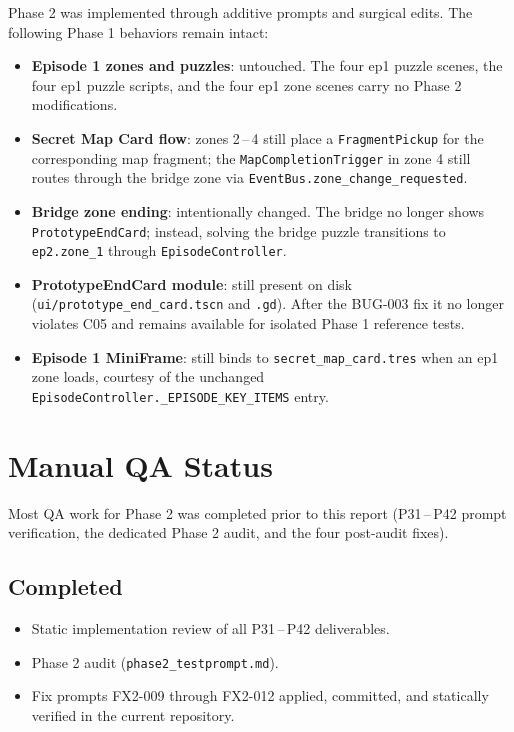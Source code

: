 \documentclass[12pt, a4paper]{article}
\begin{document}
Phase 2 was implemented through additive prompts and surgical edits. The
following Phase 1 behaviors remain intact:

\begin{itemize}[nosep]
  \item \textbf{Episode 1 zones and puzzles}: untouched. The four ep1 puzzle
        scenes, the four ep1 puzzle scripts, and the four ep1 zone scenes
        carry no Phase 2 modifications.
  \item \textbf{Secret Map Card flow}: zones 2\,--\,4 still place a
        \texttt{FragmentPickup} for the corresponding map fragment; the
        \texttt{MapCompletionTrigger} in zone 4 still routes through the
        bridge zone via \texttt{EventBus.zone\_change\_requested}.
  \item \textbf{Bridge zone ending}: intentionally changed. The bridge no
        longer shows \texttt{PrototypeEndCard}; instead, solving the bridge
        puzzle transitions to \texttt{ep2.zone\_1} through
        \texttt{EpisodeController}.
  \item \textbf{PrototypeEndCard module}: still present on disk
        (\texttt{ui/prototype\_end\_card.tscn} and \texttt{.gd}). After the
        BUG-003 fix it no longer violates C05 and remains available for
        isolated Phase 1 reference tests.
  \item \textbf{Episode 1 MiniFrame}: still binds to
        \texttt{secret\_map\_card.tres} when an ep1 zone loads, courtesy of
        the unchanged \texttt{EpisodeController.\_EPISODE\_KEY\_ITEMS} entry.
\end{itemize}

\section{Manual QA Status}

Most QA work for Phase 2 was completed prior to this report (P31\,--\,P42
prompt verification, the dedicated Phase 2 audit, and the four post-audit
fixes).

\subsection{Completed}

\begin{itemize}[nosep]
  \item Static implementation review of all P31\,--\,P42 deliverables.
  \item Phase 2 audit (\texttt{phase2\_testprompt.md}).
  \item Fix prompts FX2-009 through FX2-012 applied, committed, and
        statically verified in the current repository.
\end{itemize}
\end{document}
